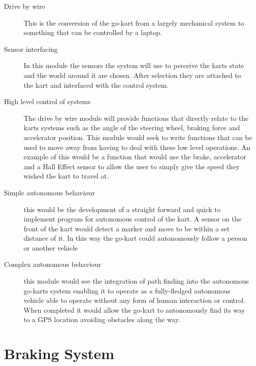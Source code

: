 \begin{description}
\item[Drive by wire] This is the conversion of the go-kart from a largely mechanical system to something that can be controlled by a laptop. 

\item[Sensor interfacing] In this module the sensors the system will use to perceive the karts state and the world around it are chosen. After selection they are attached to the kart and interfaced with the control system. 

\item[High level control of systems] The drive by wire module will provide functions that directly relate to the karts systems such as the angle of the steering wheel, braking force and accelerator position. This module would seek to write functions that can be used to move away from having to deal with these low level operations. An example of this would be a function that would use the brake, accelerator and a Hall Effect sensor to allow the user to simply give the speed they wished the kart to travel at.  

\item[Simple autonomous behaviour] this would be the development of a straight forward and quick to implement program for autonomous control of the kart. A sensor on the front of the kart would detect a marker and move to be within a set distance of it. In this way the go-kart could autonomously follow a person or another vehicle

\item[Complex autonomous behaviour] this module would see the integration of path finding into the autonomous go-karts system enabling it to operate as a fully-fledged autonomous vehicle able to operate without any form of human interaction or control. When completed it would allow the go-kart to autonomously find its way to a GPS location avoiding obstacles along the way.
\end{description}

\section{Braking System}

